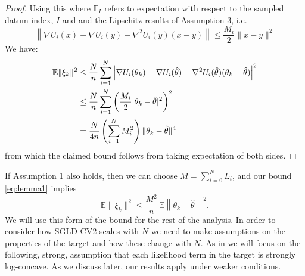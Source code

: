 \begin{proof}
Using this where $\mathbb{E}_I$ refers to 
expectation with respect to the sampled datum index, $I$ and and the Lipschitz results of Assumption 3, i.e. $$\left\| \nabla U_i(x) - \nabla U_i(y) - \nabla^2 U_i(y)(x - y) \right\| \leq \frac{M_i}{2} \|x - y\|^2$$
We have:
\begin{align}
\mathbb{E}\|\xi_k\|^2 
&\leq \frac{N}{n} \sum_{i=1}^N \left| \nabla U_i(\theta_k) - \nabla U_i(\hat\theta) - \nabla^2 U_i(\hat\theta)(\theta_k - \hat\theta) \right|^2 \notag\\
&\leq \frac{N}{n} \sum_{i=1}^N \left( \frac{M_i}{2} |\theta_k - \hat\theta|^2 \right)^2 \notag\\
&= \frac{N}{4n} \left( \sum_{i=1}^N M_i^2 \right) \|\theta_k - \hat\theta\|^4
\end{align}
from which the claimed bound follows from taking expectation of both sides.
\end{proof}

If Assumption 1 also holds, then we 
can choose $M = \sum_{i=0}^N L_i$, and our bound \eqref{eq:lemma1} implies
$$
    \mathbb{E}\|\xi_k\|^2 \leq \frac{M^2}{n}\,\mathbb{E}\left\|\theta_k - \hat{\theta}\right\|^2.
$$
We will use this form of the bound for the rest of the analysis. In order to consider how SGLD-CV2 scales with $N$ we need to make assumptions 
on the properties of the target and how these change with $N$. As in \citet{baker2017} we will focus on the following, strong, assumption that 
each likelihood term in the target is strongly log-concave. As we discuss 
later, our results apply under weaker conditions.

